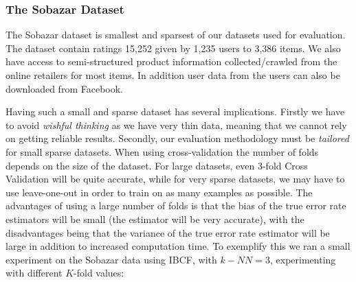 %

\subsubsection{The Sobazar Dataset}

The Sobazar dataset is smallest and sparsest of our datasets used for evaluation. The dataset contain ratings 15,252 given by 	1,235 users to 3,386 items. We also have access to semi-structured product information collected/crawled from the online retailers for most items. In addition user data from the users can also be downloaded from Facebook.

Having such a small and sparse dataset has several implications. Firstly we have to avoid \emph{wishful thinking} as we have very thin data, meaning that we cannot rely on getting reliable results. Secondly, our evaluation methodology must be \emph{tailored} for small sparse datasets. When using cross-validation the number of folds depends on the size of the dataset. For large datasets, even 3-fold Cross Validation will be quite accurate, while for very sparse datasets, we may have to use leave-one-out in order to train on as many examples as possible. The advantages of using a large number of folds is that the bias of the true error rate estimators will be small (the estimator will be very accurate), with the disadvantages being that the variance of the true error rate estimator will be large in addition to increased computation time. To exemplify this we ran a small experiment on the Sobazar data using IBCF, with $k-NN=3$, experimenting with different $K$-fold values:

